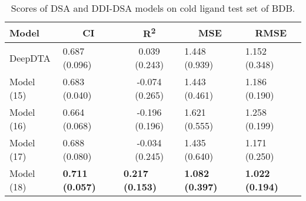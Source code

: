 \begin{table}
\centering
\caption{Scores of DSA and DDI-DSA models on cold ligand test set of BDB.}
\vspace{0.25em}
\begin{tabular}{|l|l|c|l|l|} 
\hline
Model & \multicolumn{1}{c|}{CI} & R\textsuperscript{2} & \multicolumn{1}{c|}{MSE} & \multicolumn{1}{c|}{RMSE} \\ 
\hline
DeepDTA & 0.687 (0.096) & 0.039 (0.243) & 1.448 (0.939) & 1.152 (0.348) \\ 
\hline
Model (15) & 0.683 (0.040) & -0.074 (0.265) & 1.443 (0.461) & 1.186 (0.190) \\ 
\hline
Model (16) & 0.664 (0.068) & -0.196 (0.196) & 1.621 (0.555) & 1.258 (0.199) \\ 
\hline
Model (17) & 0.688 (0.080) & -0.034 (0.245) & 1.435 (0.640) & 1.171 (0.250) \\ 
\hline
Model (18) & \textbf{0.711 (0.057)} & \multicolumn{1}{l|}{\textbf{0.217 (0.153)}} & \textbf{1.082 (0.397)} & \textbf{1.022 (0.194)} \\
\hline
\end{tabular}
\label{tab:side_ligand}
\end{table}